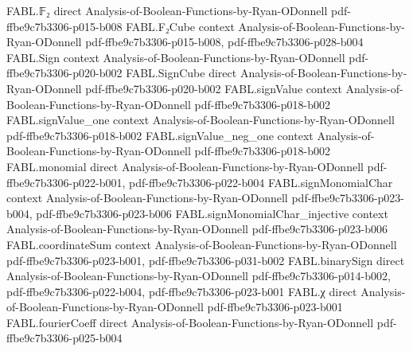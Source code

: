 \begin{theorem}
\label{FABL.repeatAndFunctionTester_amplifies}
\leanok
{}
\proofstep
  {FABL.𝔽₂}
  {direct}
  {Analysis-of-Boolean-Functions-by-Ryan-ODonnell}
  {pdf-ffbe9c7b3306-p015-b008}
\proofstep
  {FABL.F₂Cube}
  {context}
  {Analysis-of-Boolean-Functions-by-Ryan-ODonnell}
  {pdf-ffbe9c7b3306-p015-b008,
    pdf-ffbe9c7b3306-p028-b004}
\proofstep
  {FABL.Sign}
  {context}
  {Analysis-of-Boolean-Functions-by-Ryan-ODonnell}
  {pdf-ffbe9c7b3306-p020-b002}
\proofstep
  {FABL.SignCube}
  {direct}
  {Analysis-of-Boolean-Functions-by-Ryan-ODonnell}
  {pdf-ffbe9c7b3306-p020-b002}
\proofstep
  {FABL.signValue}
  {context}
  {Analysis-of-Boolean-Functions-by-Ryan-ODonnell}
  {pdf-ffbe9c7b3306-p018-b002}
\proofstep
  {FABL.signValue_one}
  {context}
  {Analysis-of-Boolean-Functions-by-Ryan-ODonnell}
  {pdf-ffbe9c7b3306-p018-b002}
\proofstep
  {FABL.signValue_neg_one}
  {context}
  {Analysis-of-Boolean-Functions-by-Ryan-ODonnell}
  {pdf-ffbe9c7b3306-p018-b002}
\proofstep
  {FABL.monomial}
  {direct}
  {Analysis-of-Boolean-Functions-by-Ryan-ODonnell}
  {pdf-ffbe9c7b3306-p022-b001,
    pdf-ffbe9c7b3306-p022-b004}
\proofstep
  {FABL.signMonomialChar}
  {context}
  {Analysis-of-Boolean-Functions-by-Ryan-ODonnell}
  {pdf-ffbe9c7b3306-p023-b004,
    pdf-ffbe9c7b3306-p023-b006}
\proofstep
  {FABL.signMonomialChar_injective}
  {context}
  {Analysis-of-Boolean-Functions-by-Ryan-ODonnell}
  {pdf-ffbe9c7b3306-p023-b006}
\proofstep
  {FABL.coordinateSum}
  {context}
  {Analysis-of-Boolean-Functions-by-Ryan-ODonnell}
  {pdf-ffbe9c7b3306-p023-b001,
    pdf-ffbe9c7b3306-p031-b002}
\proofstep
  {FABL.binarySign}
  {direct}
  {Analysis-of-Boolean-Functions-by-Ryan-ODonnell}
  {pdf-ffbe9c7b3306-p014-b002,
    pdf-ffbe9c7b3306-p022-b004,
    pdf-ffbe9c7b3306-p023-b001}
\proofstep
  {FABL.χ}
  {direct}
  {Analysis-of-Boolean-Functions-by-Ryan-ODonnell}
  {pdf-ffbe9c7b3306-p023-b001}
\proofstep
  {FABL.fourierCoeff}
  {direct}
  {Analysis-of-Boolean-Functions-by-Ryan-ODonnell}
  {pdf-ffbe9c7b3306-p025-b004}
\proofstep

\end{theorem}
